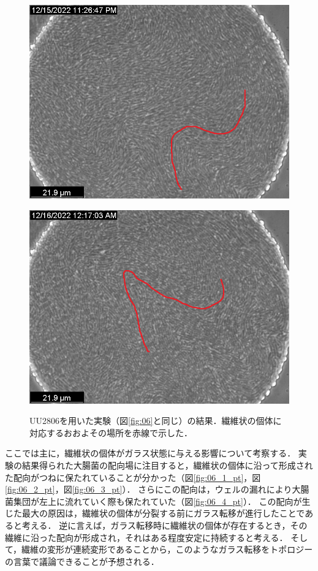 \documentclass[a4paper,11pt,titlepage]{jsarticle}
\begin{document}
\begin{figure}[htbp]
\begin{minipage}{0.45\linewidth}
    \includegraphics[width=\columnwidth]{Series015_t150000_ch00.png}
    \label{fig:06_3_pt}
  \end{minipage}
  \begin{minipage}{0.45\linewidth}
    \centering
    \includegraphics[width=\columnwidth]{Series015_t180000_ch00.png}
    \label{fig:06_4_pt}
  \end{minipage}
  \caption{UU2806を用いた実験（図\ref{fig:06}と同じ）の結果．繊維状の個体に対応するおおよその場所を赤線で示した．}
  \label{fig:06_pt}
\end{figure}

ここでは主に，繊維状の個体がガラス状態に与える影響について考察する．
実験の結果得られた大腸菌の配向場に注目すると，繊維状の個体に沿って形成された配向がつねに保たれていることが分かった（図\ref{fig:06_1_pt}，図\ref{fig:06_2_pt}，図\ref{fig:06_3_pt}）．
さらにこの配向は，ウェルの漏れにより大腸菌集団が左上に流れていく際も保たれていた（図\ref{fig:06_4_pt}）．
この配向が生じた最大の原因は，繊維状の個体が分裂する前にガラス転移が進行したことであると考える．
逆に言えば，ガラス転移時に繊維状の個体が存在するとき，その繊維に沿った配向が形成され，それはある程度安定に持続すると考える．
そして，繊維の変形が連続変形であることから，このようなガラス転移をトポロジーの言葉で議論できることが予想される．
\end{document}
